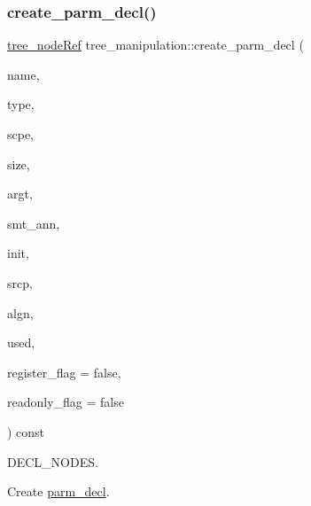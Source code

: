 \subsubsection{\texorpdfstring{create\+\_\+parm\+\_\+decl()}{create\_parm\_decl()}}
{\footnotesize\ttfamily \hyperlink{tree__node_8hpp_a6ee377554d1c4871ad66a337eaa67fd5}{tree\+\_\+node\+Ref} tree\+\_\+manipulation\+::create\+\_\+parm\+\_\+decl (\begin{DoxyParamCaption}\item[{const \hyperlink{tree__node_8hpp_a6ee377554d1c4871ad66a337eaa67fd5}{tree\+\_\+node\+Ref} \&}]{name,  }\item[{const \hyperlink{tree__node_8hpp_a6ee377554d1c4871ad66a337eaa67fd5}{tree\+\_\+node\+Ref} \&}]{type,  }\item[{const \hyperlink{tree__node_8hpp_a6ee377554d1c4871ad66a337eaa67fd5}{tree\+\_\+node\+Ref} \&}]{scpe,  }\item[{const \hyperlink{tree__node_8hpp_a6ee377554d1c4871ad66a337eaa67fd5}{tree\+\_\+node\+Ref} \&}]{size,  }\item[{const \hyperlink{tree__node_8hpp_a6ee377554d1c4871ad66a337eaa67fd5}{tree\+\_\+node\+Ref} \&}]{argt,  }\item[{const \hyperlink{tree__node_8hpp_a6ee377554d1c4871ad66a337eaa67fd5}{tree\+\_\+node\+Ref} \&}]{smt\+\_\+ann,  }\item[{const \hyperlink{tree__node_8hpp_a6ee377554d1c4871ad66a337eaa67fd5}{tree\+\_\+node\+Ref} \&}]{init,  }\item[{const std\+::string \&}]{srcp,  }\item[{unsigned int}]{algn,  }\item[{int}]{used,  }\item[{bool}]{register\+\_\+flag = {\ttfamily false},  }\item[{bool}]{readonly\+\_\+flag = {\ttfamily false} }\end{DoxyParamCaption}) const}



D\+E\+C\+L\+\_\+\+N\+O\+D\+ES. 

Create \hyperlink{structparm__decl}{parm\+\_\+decl}.

